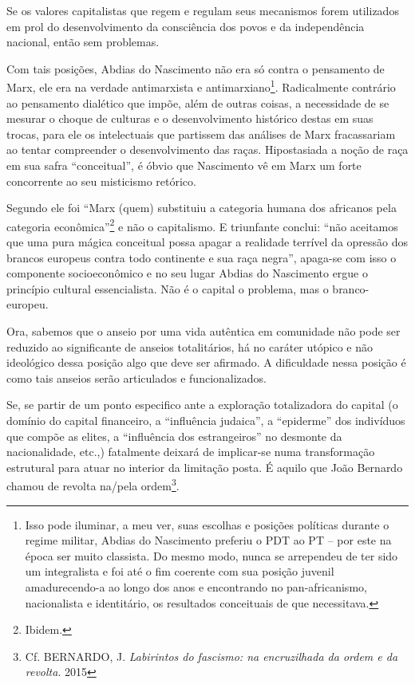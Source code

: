 Se os valores capitalistas que regem e regulam seus mecanismos forem
utilizados em prol do desenvolvimento da consciência dos povos e da
independência nacional, então sem problemas.

Com tais posições, Abdias do Nascimento não era só contra o pensamento
de Marx, ele era na verdade antimarxista e antimarxiano\footnote{Isso
  pode iluminar, a meu ver, suas escolhas e posições políticas durante o
  regime militar, Abdias do Nascimento preferiu o PDT ao PT -- por este
  na época ser muito classista. Do mesmo modo, nunca se arrependeu de
  ter sido um integralista e foi até o fim coerente com sua posição
  juvenil amadurecendo-a ao longo dos anos e encontrando no
  pan-africanismo, nacionalista e identitário, os resultados conceituais
  de que necessitava.}. Radicalmente contrário ao pensamento dialético
que impõe, além de outras coisas, a necessidade de se mesurar o choque
de culturas e o desenvolvimento histórico destas em suas trocas, para
ele os intelectuais que partissem das análises de Marx fracassariam ao
tentar compreender o desenvolvimento das raças. Hipostasiada a noção de
raça em sua safra ``conceitual'', é óbvio que Nascimento vê em Marx um
forte concorrente ao seu misticismo retórico.

Segundo ele foi ``Marx (quem) substituiu a categoria humana dos
africanos pela categoria econômica''\footnote{Ibidem.} e não o
capitalismo. E triunfante conclui: ``não aceitamos que uma pura mágica
conceitual possa apagar a realidade terrível da opressão dos brancos
europeus contra todo continente e sua raça negra'', apaga-se com isso o
componente socioeconômico e no seu lugar Abdias do Nascimento ergue o
princípio cultural essencialista. Não é o capital o problema, mas o
branco-europeu.

Ora, sabemos que o anseio por uma vida autêntica em comunidade não pode
ser reduzido ao significante de anseios totalitários, há no caráter
utópico e não ideológico dessa posição algo que deve ser afirmado. A
dificuldade nessa posição é como tais anseios serão articulados e
funcionalizados.

Se, se partir de um ponto especifico ante a exploração totalizadora do
capital (o domínio do capital financeiro, a ``influência judaica'', a
``epiderme'' dos indivíduos que compõe as elites, a ``influência dos
estrangeiros'' no desmonte da nacionalidade, etc.,) fatalmente deixará
de implicar-se numa transformação estrutural para atuar no interior da
limitação posta. É aquilo que João Bernardo chamou de revolta na/pela
ordem\footnote{Cf. BERNARDO, J. \emph{Labirintos do fascismo: na
  encruzilhada da ordem e da revolta}. 2015}.

